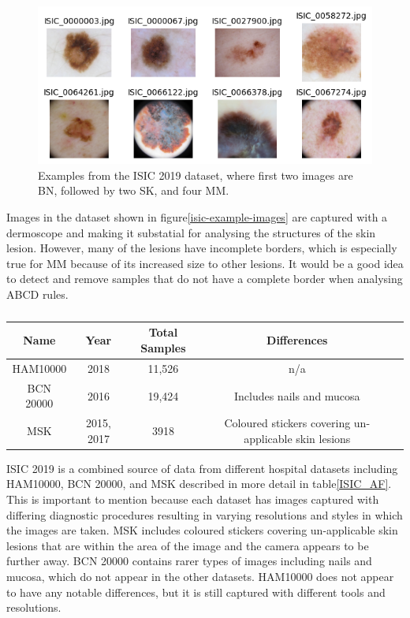 \begin{figure}
    \centering
    \includegraphics[scale=0.75]{images/ISIC/isic-example-images.png}
    \caption{Examples from the ISIC 2019 dataset, where first two images are BN, followed by two SK, and four MM.} 
\end{figure}\label{isic-example-images}

Images in the dataset shown in figure\ref{isic-example-images} are captured with a dermoscope and making it substatial for analysing the structures of the skin lesion. However, many of the lesions have incomplete borders, which is especially true for MM because of its increased size to other lesions. It would be a good idea to detect and remove samples that do not have a complete border when analysing ABCD rules.

\begin{table}
    \small
    \begin{tabular}{|c|c|c|c|c|}
        \hline
        Name & Year & Total Samples & Differences \\
        \hline
        HAM10000 & 2018 & 11,526 & n/a
        \\
        \hline
        BCN 20000 & 2016 & 19,424 & Includes nails and mucosa
        \\
        \hline
        MSK & 2015, 2017 & 3918 & Coloured stickers covering un-applicable skin lesions
        \\
        \hline  
    \end{tabular}
    \caption{}
\end{table}\label{ISIC_AF}


ISIC 2019 is a combined source of data from different hospital datasets including HAM10000, BCN 20000, and MSK described in more detail in table\ref{ISIC_AF}. This is important to mention because each dataset has images captured with differing diagnostic procedures resulting in varying resolutions and styles in which the images are taken. MSK includes coloured stickers covering un-applicable skin lesions that are within the area of the image and the camera appears to be further away. BCN 20000 contains rarer types of images including nails and mucosa, which do not appear in the other datasets. HAM10000 does not appear to have any notable differences, but it is still captured with different tools and resolutions.

